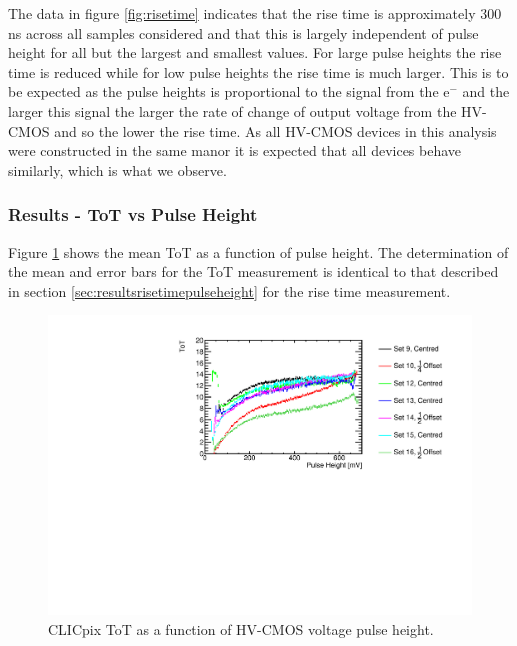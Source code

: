 The data in figure \ref{fig:risetime} indicates that the rise time is approximately 300 ns across all samples considered and that this is largely independent of pulse height for all but the largest and smallest values.  For large pulse heights the rise time is reduced while for low pulse heights the rise time is much larger.  This is to be expected as the pulse heights is proportional to the signal from the $\text{e}^{-}$ and the larger this signal the larger the rate of change of output voltage from the HV-CMOS and so the lower the rise time.  As all HV-CMOS devices in this analysis were constructed in the same manor it is expected that all devices behave similarly, which is what we observe.


\subsubsection{Results -  ToT vs Pulse Height}
Figure \ref{fig:tot} shows the mean ToT as a function of pulse height.  The determination of the mean and error bars for the ToT measurement is identical to that described in section \ref{sec:resultsrisetimepulseheight} for the rise time measurement. 

\begin{figure}
\centering
\includegraphics[width=1.0\textwidth]{CLICdpVertex/Plots/RadSourceAnalysis/AllSETs_TargetTot_PulseHeight.pdf}
\caption[CLICpix ToT as a function of HV-CMOS voltage pulse height.]{CLICpix ToT as a function of HV-CMOS voltage pulse height.}
\label{fig:tot}
\end{figure}

